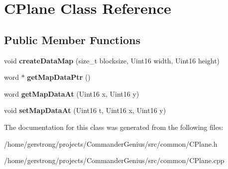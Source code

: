 \hypertarget{class_c_plane}{
\section{CPlane Class Reference}
\label{class_c_plane}
}
\subsection*{Public Member Functions}
\begin{DoxyCompactItemize}
\item 
\hypertarget{class_c_plane_a7ee74eacd42d9ca7759d3f79e3b63da5}{
void {\bfseries createDataMap} (size\_\-t blocksize, Uint16 width, Uint16 height)}
\label{class_c_plane_a7ee74eacd42d9ca7759d3f79e3b63da5}

\item 
\hypertarget{class_c_plane_a3698d27e259998cf5fe64c921a21b7f9}{
word $\ast$ {\bfseries getMapDataPtr} ()}
\label{class_c_plane_a3698d27e259998cf5fe64c921a21b7f9}

\item 
\hypertarget{class_c_plane_ae3f0fc8d032795d63994195867ab982c}{
word {\bfseries getMapDataAt} (Uint16 x, Uint16 y)}
\label{class_c_plane_ae3f0fc8d032795d63994195867ab982c}

\item 
\hypertarget{class_c_plane_a85d4896184727a73602df8f9151c57a6}{
void {\bfseries setMapDataAt} (Uint16 t, Uint16 x, Uint16 y)}
\label{class_c_plane_a85d4896184727a73602df8f9151c57a6}

\end{DoxyCompactItemize}


The documentation for this class was generated from the following files:\begin{DoxyCompactItemize}
\item 
/home/gerstrong/projects/CommanderGenius/src/common/CPlane.h\item 
/home/gerstrong/projects/CommanderGenius/src/common/CPlane.cpp\end{DoxyCompactItemize}
